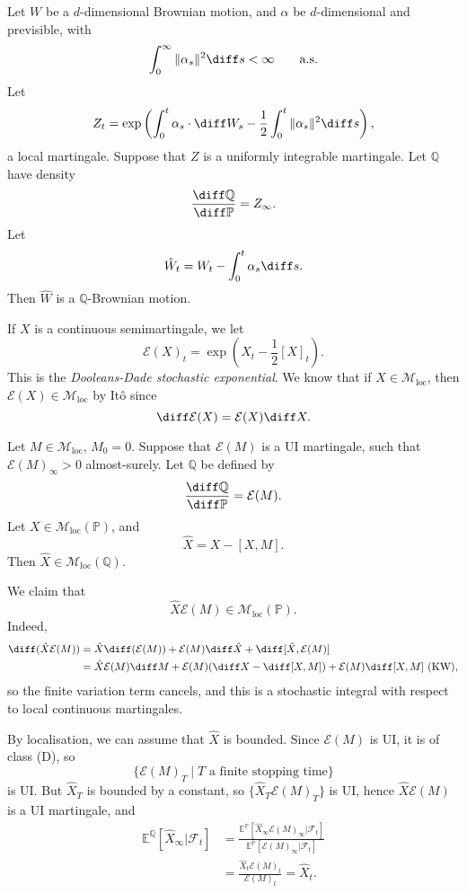\documentclass[12pt]{article}
\begin{document}
\begin{theorem}
	Let $W$ be a $d$-dimensional Brownian motion, and $\alpha$ be $d$-dimensional and previsible, with
	\[
		\int_0^{\infty} \|\alpha_s\|^2 \diff s < \infty \qquad \text{a.s.}
	\]
	Let
	\[
	Z_t = \exp \left( \int_0^{t} \alpha_s \cdot \diff W_s - \frac 12 \int_0^{t} \|\alpha_s\|^2 \diff s \right),
	\]
	a local martingale. Suppose that $Z$ is a uniformly integrable martingale. Let $\mathbb{Q}$ have density
	\[
	\frac{\diff \mathbb{Q}}{\diff \mathbb{P}} = Z_\infty.
	\]
	Let
	\[
	\hat W_t = W_t - \int_0^{t} \alpha_s \diff s.
	\]
	Then $\hat W$ is a $\mathbb{Q}$-Brownian motion.
\end{theorem}


If $X$ is a continuous semimartingale, we let
\[
	\mathcal{E}(X)_t = \exp\left( X_t - \frac 12 [X]_t \right).
\]
This is the \emph{Dooleans-Dade stochastic exponential}. We know that if $X \in \mathcal{M}_{\mathrm{loc}}$, then $\mathcal{E}(X) \in \mathcal{M}_{\mathrm{loc}}$ by It\^o since
\[
\diff \mathcal{E}(X) = \mathcal{E}(X) \diff X.
\]
\begin{proposition}
	Let $M \in \mathcal{M}_{\mathrm{loc}}$, $M_0 = 0$. Suppose that $\mathcal{E}(M)$ is a UI martingale, such that $\mathcal{E}(M)_\infty > 0$ almost-surely. Let $\mathbb{Q}$ be defined by
	\[
	\frac{\diff \mathbb{Q}}{\diff \mathbb{P}} = \mathcal{E}(M).
	\]
	Let $X \in \mathcal{M}_{\mathrm{loc}}(\mathbb{P})$, and
	\[
		\hat X = X - [X, M].
	\]
	Then $\hat X \in \mathcal{M}_{\mathrm{loc}}(\mathbb{Q})$.
\end{proposition}

\begin{proofbox}
	We claim that
	\[
	\hat X \mathcal{E}(M) \in \mathcal{M}_{\mathrm{loc}}(\mathbb{P}).
	\]
	Indeed,
	\begin{align*}
		\diff (\hat X \mathcal{E}(M)) &= \hat X \diff (\mathcal{E}(M)) + \mathcal{E}(M) \diff \hat X + \diff [\hat X, \mathcal{E}(M)] \\
					      &= \hat X \mathcal{E}(M) \diff M + \mathcal{E}(M)(\diff X - \diff [X, M]) + \mathcal{E}(M) \diff [X, M] \text{ (KW)},
	\end{align*}
	so the finite variation term cancels, and this is a stochastic integral with respect to local continuous martingales.

	By localisation, we can assume that $\hat X$ is bounded. Since $\mathcal{E}(M)$ is UI, it is of class (D), so
	\[
		\{\mathcal{E}(M)_T \mid T \text{ a finite stopping time}\}
	\]
	is UI. But $\hat X_T$ is bounded by a constant, so $\{\hat X_T \mathcal{E}(M)_T\}$ is UI, hence $\hat X \mathcal{E}(M)$ is a UI martingale, and
	\begin{align*}
		\mathbb{E}^{\mathbb{Q}}[\hat X_\infty | \mathcal{F}_t] &= \frac{\mathbb{E}^{\mathbb{P}}[\hat X_\infty \mathcal{E}(M)_\infty | \mathcal{F}_t]}{\mathbb{E}^{\mathbb{P}}[\mathcal{E}(M)_\infty | \mathcal{F}_t]} \\
								       &= \frac{\hat X_t \mathcal{E}(M)_t}{\mathcal{E}(M)_t} = \hat X_t.
	\end{align*}
\end{proofbox}
\end{document}
